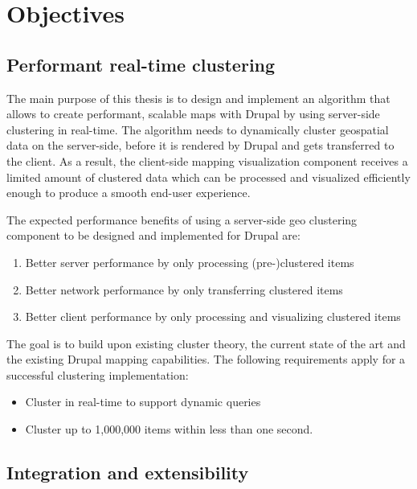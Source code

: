 
%
%

\chapter{Objectives}
\label{chapter:objectives}


\section{Performant real-time clustering}
\label{chapter:objective-performance}

The main purpose of this thesis is to design and implement an algorithm that allows to create performant, scalable maps with Drupal by using server-side clustering in real-time. The algorithm needs to dynamically cluster geospatial data on the server-side, before it is rendered by Drupal and gets transferred to the client. As a result, the client-side mapping visualization component receives a limited amount of clustered data which can be processed and visualized efficiently enough to produce a smooth end-user experience.

The expected performance benefits of using a server-side geo clustering component to be designed and implemented for Drupal are:

\begin{enumerate}

\item Better server performance by only processing (pre-)clustered items
\item Better network performance by only transferring clustered items 
\item Better client performance by only processing and visualizing clustered items 

\end{enumerate}

The goal is to build upon existing cluster theory, the current state of the art and the existing Drupal mapping capabilities. The following requirements apply for a successful clustering implementation:

\begin{itemize}

\item Cluster in real-time to support dynamic queries
\item Cluster up to 1,000,000 items within less than one second.

\end{itemize}


\section{Integration and extensibility}
\label{chapter:objective-integration}

